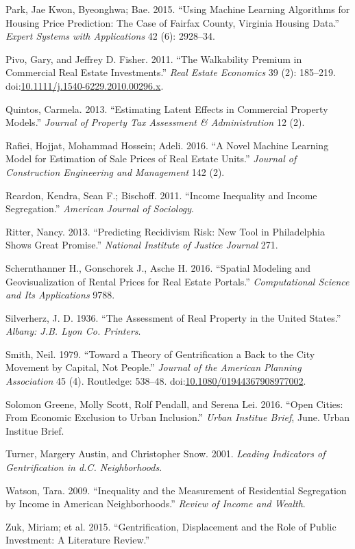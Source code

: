 \documentclass[12pt,]{article}
\begin{document}
\hypertarget{ref-Park2015}{}
Park, Jae Kwon, Byeonghwa; Bae. 2015. ``Using Machine Learning
Algorithms for Housing Price Prediction: The Case of Fairfax County,
Virginia Housing Data.'' \emph{Expert Systems with Applications} 42 (6):
2928--34.

\hypertarget{ref-Pivo2011}{}
Pivo, Gary, and Jeffrey D. Fisher. 2011. ``The Walkability Premium in
Commercial Real Estate Investments.'' \emph{Real Estate Economics} 39
(2): 185--219.
doi:\href{https://doi.org/10.1111/j.1540-6229.2010.00296.x}{10.1111/j.1540-6229.2010.00296.x}.

\hypertarget{ref-Quintos2013}{}
Quintos, Carmela. 2013. ``Estimating Latent Effects in Commercial
Property Models.'' \emph{Journal of Property Tax Assessment \&
Administration} 12 (2).

\hypertarget{ref-Rafiei2016}{}
Rafiei, Hojjat, Mohammad Hossein; Adeli. 2016. ``A Novel Machine
Learning Model for Estimation of Sale Prices of Real Estate Units.''
\emph{Journal of Construction Engineering and Management} 142 (2).

\hypertarget{ref-Reardon2011}{}
Reardon, Kendra, Sean F.; Bischoff. 2011. ``Income Inequality and Income
Segregation.'' \emph{American Journal of Sociology}.

\hypertarget{ref-Ritter2013}{}
Ritter, Nancy. 2013. ``Predicting Recidivism Risk: New Tool in
Philadelphia Shows Great Promise.'' \emph{National Institute of Justice
Journal} 271.

\hypertarget{ref-Schernthanner2016}{}
Schernthanner H., Gonschorek J., Asche H. 2016. ``Spatial Modeling and
Geovisualization of Rental Prices for Real Estate Portals.''
\emph{Computational Science and Its Applications} 9788.

\hypertarget{ref-Silverherz1936}{}
Silverherz, J. D. 1936. ``The Assessment of Real Property in the United
States.'' \emph{Albany: J.B. Lyon Co. Printers}.

\hypertarget{ref-Smith1979}{}
Smith, Neil. 1979. ``Toward a Theory of Gentrification a Back to the
City Movement by Capital, Not People.'' \emph{Journal of the American
Planning Association} 45 (4). Routledge: 538--48.
doi:\href{https://doi.org/10.1080/01944367908977002}{10.1080/01944367908977002}.

\hypertarget{ref-urban2016}{}
Solomon Greene, Molly Scott, Rolf Pendall, and Serena Lei. 2016. ``Open
Cities: From Economic Exclusion to Urban Inclusion.'' \emph{Urban
Institue Brief}, June. Urban Institue Brief.

\hypertarget{ref-Turner2001}{}
Turner, Margery Austin, and Christopher Snow. 2001. \emph{Leading
Indicators of Gentrification in d.C. Neighborhoods}.

\hypertarget{ref-Watson2009}{}
Watson, Tara. 2009. ``Inequality and the Measurement of Residential
Segregation by Income in American Neighborhoods.'' \emph{Review of
Income and Wealth}.

\hypertarget{ref-Zuk2015}{}
Zuk, Miriam; et al. 2015. ``Gentrification, Displacement and the Role of
Public Investment: A Literature Review.''
\end{document}
